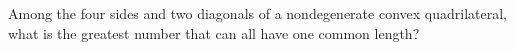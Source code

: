 Among the four sides and two diagonals of a nondegenerate convex quadrilateral, what is the greatest number that can all have one common length?
